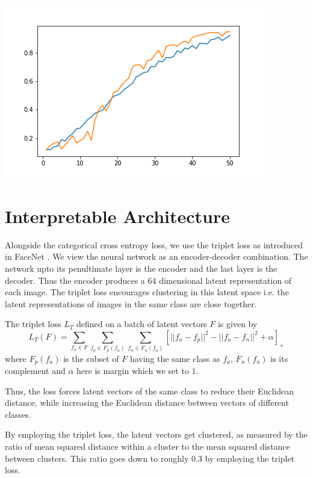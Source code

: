 \documentclass{article}
\begin{document}
\begin{sloppypar}
\begin{itemize}
\begin{center}
                \hfill
                \begin{minipage}[b]{0.45\linewidth}
                    \includegraphics[width = \linewidth]{analysis/optimizer/sgd/sgd.png}
                \end{minipage}
            \end{center}
    \end{itemize}

    \section{Interpretable Architecture}
    Alongside the categorical cross entropy loss, we use the triplet loss as introduced in FaceNet \cite{facenet}. We view the neural network as an encoder-decoder combination.
    The network upto its penultimate layer is the encoder and the last layer is the decoder. Thus the encoder produces a $64$ dimensional latent representation of each image. 
    The triplet loss encourages clustering in this latent space i.e. the latent representations of images in the same class are close together.
    \par The triplet loss $L_T$ defined on a batch of latent vectors $F$ is given by 
    \begin{equation*}
        L_T(F) = \sum_{f_a \in F} \sum_{f_p \in F_p(f_a)} \sum_{f_n \in F_n(f_a)} [ ||f_a - f_p||^2 - ||f_a - f_n||^2 + \alpha ]_+
    \end{equation*}
    where $F_p(f_a)$ is the subset of $F$ having the same class as $f_a$, $F_n(f_a)$ is its complement and $\alpha$ here is margin which we set to $1$.
    \par Thus, the loss forces latent vectors of the same class to reduce their Euclidean distance, while increasing the Euclidean distance between vectors of different classes.
    \par By employing the triplet loss, the latent vectors get clustered, as measured by the ratio of mean squared distance within a cluster to the mean squared distance between clusters.
    This ratio goes down to roughly $0.3$ by employing the triplet loss.


\end{sloppypar}
\end{document}
